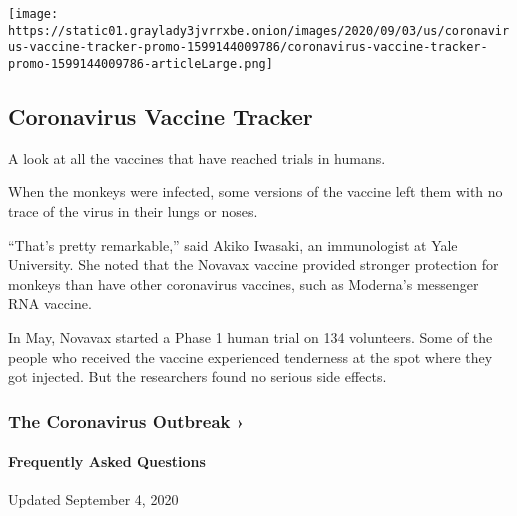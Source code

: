 \href{https://www.nytimes3xbfgragh.onion/interactive/2020/science/coronavirus-vaccine-tracker.html}{}

\texttt{[image: https://static01.graylady3jvrrxbe.onion/images/2020/09/03/us/coronavirus-vaccine-tracker-promo-1599144009786/coronavirus-vaccine-tracker-promo-1599144009786-articleLarge.png]}

\hypertarget{coronavirus-vaccine-tracker}{%
\subsection{Coronavirus Vaccine
Tracker}\label{coronavirus-vaccine-tracker}}

A look at all the vaccines that have reached trials in humans.

When the monkeys were infected, some versions of the vaccine left them
with no trace of the virus in their lungs or noses.

``That's pretty remarkable,'' said Akiko Iwasaki, an immunologist at
Yale University. She noted that the Novavax vaccine provided stronger
protection for monkeys than have other coronavirus vaccines, such as
Moderna's messenger RNA vaccine.

In May, Novavax started a Phase 1 human trial on 134 volunteers. Some of
the people who received the vaccine experienced tenderness at the spot
where they got injected. But the researchers found no serious side
effects.

\href{https://www.nytimes3xbfgragh.onion/news-event/coronavirus?action=click\&pgtype=Article\&state=default\&region=MAIN_CONTENT_3\&context=storylines_faq}{}

\hypertarget{the-coronavirus-outbreak-}{%
\subsubsection{The Coronavirus Outbreak
›}\label{the-coronavirus-outbreak-}}

\hypertarget{frequently-asked-questions}{%
\paragraph{Frequently Asked
Questions}\label{frequently-asked-questions}}

Updated September 4, 2020

